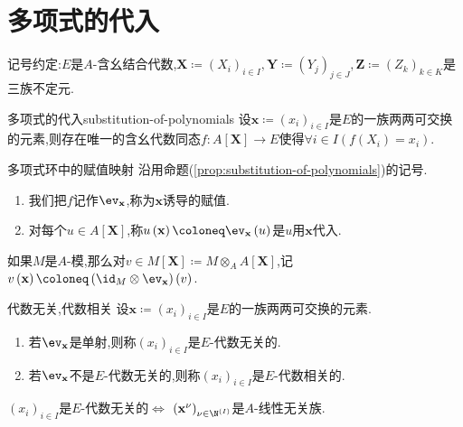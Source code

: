 \section{多项式的代入}

记号约定:$E$是$A$-含幺结合代数,$\mathbf{X}\coloneq\left(X_{i}\right)_{i\in I},\mathbf{Y}\coloneq\left(Y_{j}\right)_{j\in J},\mathbf{Z}\coloneq\left(Z_{k}\right)_{k\in K}$是三族不定元.

\begin{proposition}{多项式的代入}{substitution-of-polynomials}
	设$\mathbf{x}\coloneq\left(x_{i}\right)_{i\in I}$是$E$的一族两两可交换的元素,则存在唯一的含幺代数同态$f:A[\mathbf{X}]\to E$使得$\forall i\in I\left(f\left(X_{i}\right)=x_{i}\right)$.
\end{proposition}

\begin{definition}{多项式环中的赋值映射}{}
	沿用命题(\cref{prop:substitution-of-polynomials})的记号.
	\begin{enumerate}
		\item 我们把$f$记作$\ev_{\mathbf{x}}$,称为$\mathbf{x}$诱导的赋值.
		\item 对每个$u\in A[\mathbf{X}]$,称$u\left(\mathbf{x}\right)\coloneq\ev_{\mathbf{x}}\left(u\right)$是$u$用$\mathbf{x}$代入.
	\end{enumerate}
\end{definition}

\begin{remark}{}{}
	如果$M$是$A$-模,那么对$v\in M[\mathbf{X}]\coloneq M\otimes_{A}A[\mathbf{X}]$,记$v\left(\mathbf{x}\right)\coloneq\left(\id_{M}\otimes\ev_{\mathbf{x}}\right)\left(v\right)$.
\end{remark}

\begin{definition}{代数无关,代数相关}{}
	设$\mathbf{x}\coloneq\left(x_{i}\right)_{i\in I}$是$E$的一族两两可交换的元素.
	\begin{enumerate}
		\item 若$\ev_{\mathbf{x}}$是单射,则称$\left(x_{i}\right)_{i\in I}$是$E$-代数无关的.
		\item 若$\ev_{\mathbf{x}}$不是$E$-代数无关的,则称$\left(x_{i}\right)_{i\in I}$是$E$-代数相关的.
	\end{enumerate}
\end{definition}

\begin{remark}{}{}
	$\left(x_{i}\right)_{i\in I}$是$E$-代数无关的$\iff$ $\left(\mathbf{x}^{\nu}\right)_{\nu\in\N^{\left(I\right)}}$是$A$-线性无关族.
\end{remark}

